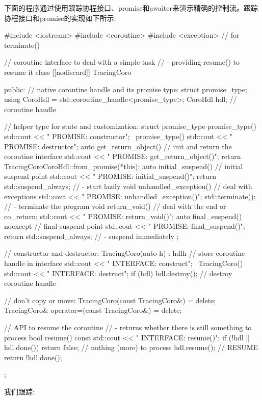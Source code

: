 下面的程序通过使用跟踪协程接口、promise和awaiter来演示精确的控制流。跟踪协程接口和promise的实现如下所示:


\begin{cpp}
#include <iostream>
#include <coroutine>
#include <exception> // for terminate()

// coroutine interface to deal with a simple task
// - providing resume() to resume it
class [[nodiscard]] TracingCoro {
	public:
	// native coroutine handle and its promise type:
	struct promise_type;
	using CoroHdl = std::coroutine_handle<promise_type>;
	CoroHdl hdl; // coroutine handle

	// helper type for state and customization:
	struct promise_type {
		promise_type() {
			std::cout << " PROMISE: constructor\n";
		}
		~promise_type() {
			std::cout << " PROMISE: destructor\n";
		}
		auto get_return_object() { // init and return the coroutine interface
			std::cout << " PROMISE: get_return_object()\n";
			return TracingCoro{CoroHdl::from_promise(*this)};
		}
		auto initial_suspend() { // initial suspend point
			std::cout << " PROMISE: initial_suspend()\n";
			return std::suspend_always{}; // - start lazily
		}
		void unhandled_exception() { // deal with exceptions
			std::cout << " PROMISE: unhandled_exception()\n";
			std::terminate(); // - terminate the program
		}
		void return_void() { // deal with the end or co_return;
			std::cout << " PROMISE: return_void()\n";
		}
		auto final_suspend() noexcept { // final suspend point
			std::cout << " PROMISE: final_suspend()\n";
			return std::suspend_always{}; // - suspend immediately
		}
	};

	// constructor and destructor:
	TracingCoro(auto h)
	: hdl{h} { // store coroutine handle in interface
	std::cout << " INTERFACE: construct\n";
	}
	~TracingCoro() {
		std::cout << " INTERFACE: destruct\n";
		if (hdl) {
			hdl.destroy(); // destroy coroutine handle
		}
	}

	// don’t copy or move:
	TracingCoro(const TracingCoro&) = delete;
	TracingCoro& operator=(const TracingCoro&) = delete;

	// API to resume the coroutine
	// - returns whether there is still something to process
	bool resume() const {
		std::cout << " INTERFACE: resume()\n";
		if (!hdl || hdl.done()) {
			return false; // nothing (more) to process
		}
		hdl.resume(); // RESUME
		return !hdl.done();
	}
};
\end{cpp}

我们跟踪:

